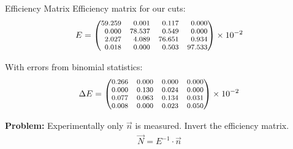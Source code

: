 \documentclass[11pt,xcolor=dvipsnames,professionalfonts]{beamer}
\begin{document}
\begin{frame}{Efficiency Matrix}
	Efficiency matrix for our cuts:
	\begin{align*}
	\footnotesize
	E = \begin{pmatrix*}[r]
	59.259 & 0.001 & 0.117 & 0.000 \\
	0.000 & 78.537 & 0.549 & 0.000 \\
	2.027 & 4.089 & 76.651 & 0.934 \\
	0.018 & 0.000 & 0.503 & 97.533 \\
	\end{pmatrix*} \times 10^{-2}
	\end{align*}
	
	\vspace{0.5cm}
	
	With errors from binomial statistics:
	\begin{align*}
	\footnotesize
	\Delta E = \begin{pmatrix*}[r]
	0.266 & 0.000 & 0.000 & 0.000 \\
	0.000 & 0.130 & 0.024 & 0.000 \\
	0.077 & 0.063 & 0.134 & 0.031 \\
	0.008 & 0.000 & 0.023 & 0.050 \\
	\end{pmatrix*} \times 10^{-2}
	\end{align*}
	
	\pause
	
	\vspace{0.5cm}
	
	\textbf{Problem:} Experimentally only $\vec{n}$ is measured. Invert the efficiency matrix.
	\begin{align*}
		\vec{N} = E^{-1} \cdot \vec{n}
	\end{align*}
\end{frame}
\end{document}
